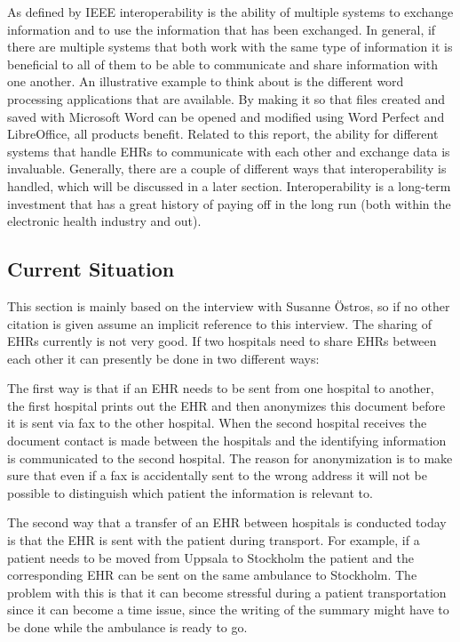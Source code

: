 \documentclass[14pt]{article}
\begin{document}

As defined by \gls{IEEE} interoperability is the ability of multiple systems to exchange information and to use the information that has been exchanged\cite{IEEE}.  In general, if there are multiple systems that both work with the same type of information it is beneficial to all of them to be able to communicate and share information with one another. An illustrative example to think about is the different word processing applications that are available. By making it so that files created and saved with Microsoft Word can be opened and modified using Word Perfect and LibreOffice, all products benefit.  Related to this report, the ability for different systems that handle EHRs to communicate with each other and exchange data is invaluable.  Generally, there are a couple of different ways that interoperability is handled, which will be discussed in a later section.  Interoperability is a long-term investment that has a great history of paying off in the long run (both within the electronic health industry and out).

\subsection{Current Situation} %
\label{sec:interopCurrent}

This section is mainly based on the interview with Susanne Östros\cite{EPJ2}, so if no other citation is given assume an implicit reference to this interview.
The sharing of EHRs currently is not very good. If two hospitals need to share EHRs between each other it can presently be done in two different ways:

The first way is that if an EHR needs to be sent from one hospital to another, the first hospital prints out the EHR and then anonymizes this document before it is sent via fax to the other hospital. When the second hospital receives the document contact is made between the hospitals and the identifying information is communicated to the second hospital. The reason for anonymization is to make sure that even if a fax is accidentally sent to the wrong address it will not be possible to distinguish which patient the information is relevant to.

The second way that a transfer of an EHR between hospitals is conducted today is that the EHR is sent with the patient during transport. For example, if a patient needs to be moved from Uppsala to Stockholm the patient and the corresponding EHR can be sent on the same ambulance to Stockholm. The problem with this is that it can become stressful during a patient transportation since it can become a time issue, since the writing of the summary might have to be done while the ambulance is ready to go.
\end{document}
